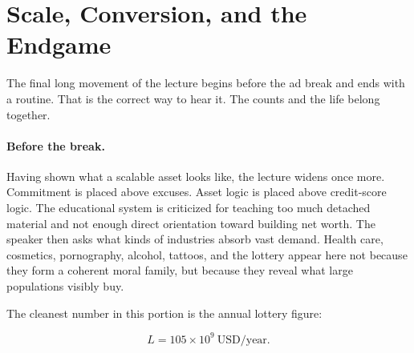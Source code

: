 \begin{figure}[h]
\centering
{}
\end{figure}

\section{Scale, Conversion, and the Endgame}

The final long movement of the lecture begins before the ad break and ends with a routine. That is the correct way to hear it. The counts and the life belong together.

\paragraph{Before the break.}
Having shown what a scalable asset looks like, the lecture widens once more. Commitment is placed above excuses. Asset logic is placed above credit-score logic. The educational system is criticized for teaching too much detached material and not enough direct orientation toward building net worth. The speaker then asks what kinds of industries absorb vast demand. Health care, cosmetics, pornography, alcohol, tattoos, and the lottery appear here not because they form a coherent moral family, but because they reveal what large populations visibly buy.

The cleanest number in this portion is the annual lottery figure:

\begin{equation}
L = 105\times 10^9\ \text{USD/year}.
\end{equation}

